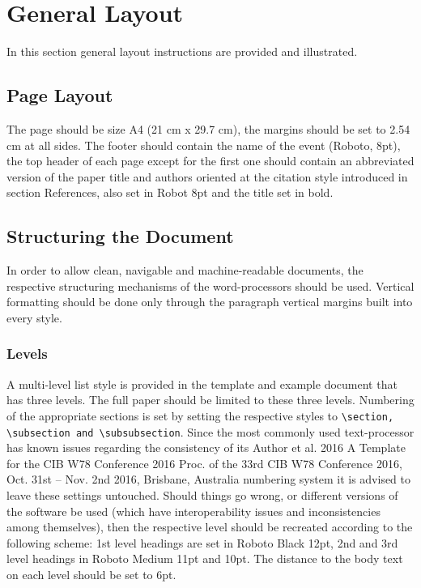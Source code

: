 \section{General Layout}

In this section general layout instructions are provided and illustrated. 
\subsection{Page Layout}
The page should be size A4 (21 cm x 29.7 cm), the margins should be set to 2.54 cm at all sides. The footer should contain the name of the event (Roboto, 8pt), the top header of each page except for the first one should contain an abbreviated version of the paper title and authors oriented at the citation style introduced in section References, also set in Robot 8pt and the title set in bold.
\subsection{Structuring the Document}
In order to allow clean, navigable and machine-readable documents, the respective structuring mechanisms of the word-processors should be used. Vertical formatting should be done only through the paragraph vertical margins built into every style. 

\subsubsection{Levels}
A multi-level list style is provided in the template and example document that has three levels. The full paper should be limited to these three levels. Numbering of the appropriate sections is 
set by setting the respective styles to \texttt{\textbackslash section, \textbackslash subsection and \textbackslash subsubsection}. Since the most commonly used text-processor has known issues regarding the consistency of its Author et al. 2016 A Template for the CIB W78 Conference 2016 Proc. of the 33rd CIB W78 Conference 2016, Oct. 31st  – Nov. 2nd  2016, Brisbane, Australia numbering system it is advised to leave these settings untouched. Should things go wrong, or different versions of the software be used (which have interoperability issues and inconsistencies among themselves), then the respective level should be recreated according to the following scheme: 1st level headings are set in Roboto Black 12pt, 2nd and 3rd level headings in Roboto Medium 11pt and 10pt. The distance to the body text on each level should be set to 6pt. 



